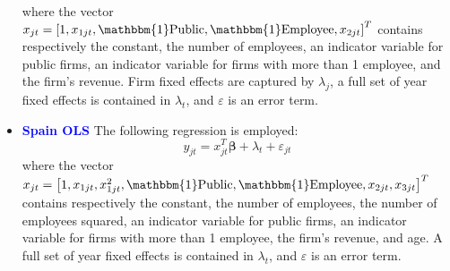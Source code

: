 \documentclass[12pt,notitlepage]{article}
\newcommand{\sym}[1] {\ifmmode^{#1} \else\(^{#1}\) \fi}
\begin{document}
\begin{itemize}
\begin{equation}
	\end{equation}
where the vector $x_{jt} = \left[  1, x_{1jt}, \mathbbm{1}\text{Public}, \mathbbm{1}\text{Employee}, x_{2jt} \right]^{T} $ contains respectively the constant, the number of employees, an indicator variable for public firms, an indicator variable for firms with more than 1 employee, and the firm's revenue. Firm fixed effects are captured by $\lambda_{j}$, a full set of year fixed effects is contained in $\lambda_{t}$, and $\varepsilon$ is an error term.
\begin{table}[htbp]\centering
\def\sym#1{\ifmmode^{#1}\else\(^{#1}\)\fi}
\caption{Haltiwanger growth rate}
\end{table}
\clearpage




\item \textcolor{blue}{\textbf{Spain OLS}}
The following regression is employed:
	\begin{equation}
	y_{jt} = x^{T}_{jt}\mathbf{\beta} + \lambda_{t} + \varepsilon_{jt}
	\end{equation}
where the vector $x_{jt} = \left[  1, x_{1jt}, x^{2}_{1jt}, \mathbbm{1}\text{Public}, \mathbbm{1}\text{Employee}, x_{2jt}, x_{3jt}  \right]^{T} $ contains respectively the constant, the number of employees, the number of employees squared, an indicator variable for public firms, an indicator variable for firms with more than 1 employee, the firm's revenue, and age. A full set of year fixed effects is contained in $\lambda_{t}$, and $\varepsilon$ is an error term.
\begin{table}[htbp]\centering
\def\sym#1{\ifmmode^{#1}\else\(^{#1}\)\fi}
\caption{Haltiwanger growth rate}
\end{table}
\clearpage


\end{itemize}
\end{document}
